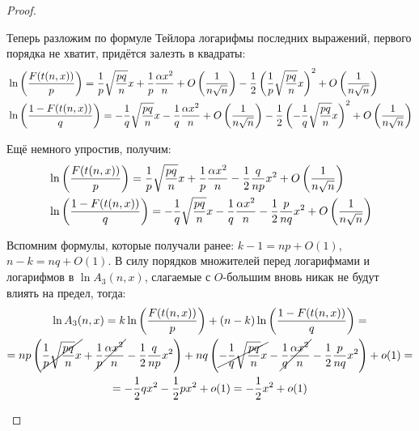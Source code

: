 \begin{proof}
\begin{itemize}
        Теперь разложим по формуле Тейлора логарифмы последних выражений, первого порядка не хватит, придётся залезть в квадраты:
        \begin{align*}
            & \ln \left(\frac{F(t(n, x))}{p}\right) = \frac{1}{p} \sqrt{\frac{pq}{n}} x + \frac{1}{p} \frac{\alpha x^2}{n} + O\left(\frac{1}{n \sqrt{n}}\right) - \frac{1}{2} \left(\frac{1}{p} \sqrt{\frac{pq}{n}} x\right)^2 + O\left(\frac{1}{n \sqrt{n}}\right)
            \\
            & \ln\left(\frac{1-F(t(n, x))}{q}\right) = -\frac{1}{q} \sqrt{\frac{pq}{n}} x - \frac{1}{q} \frac{\alpha x^2}{n} + O\left(\frac{1}{n \sqrt{n}}\right) - \frac{1}{2} \left(-\frac{1}{q} \sqrt{\frac{pq}{n}} x\right)^2 + O\left(\frac{1}{n \sqrt{n}}\right)
        \end{align*}

        Ещё немного упростив, получим:
        \begin{align*}
            & \ln \left(\frac{F(t(n, x))}{p}\right) = \frac{1}{p} \sqrt{\frac{pq}{n}} x + \frac{1}{p} \frac{\alpha x^2}{n} - \frac{1}{2} \frac{q}{np} x^2 + O\left(\frac{1}{n \sqrt{n}}\right)
            \\
            & \ln\left(\frac{1-F(t(n, x))}{q}\right) = -\frac{1}{q} \sqrt{\frac{pq}{n}} x - \frac{1}{q} \frac{\alpha x^2}{n} - \frac{1}{2} \frac{p}{nq} x^2 + O\left(\frac{1}{n \sqrt{n}}\right)
        \end{align*}

        Вспомним формулы, которые получали ранее: $k-1 = np + O(1)$, $n-k = nq + O(1)$. В силу порядков множителей перед логарифмами и логарифмов в $\ln A_3(n, x)$, слагаемые с $O$-большим вновь никак не будут влиять на предел, тогда:
        \begin{multline*}
            \ln A_3(n, x) = k \ln \left(\frac{F(t(n, x))}{p}\right) + (n-k) \ln \left(\frac{1-F(t(n, x))}{q}\right) =
            \\
            = np \left(\cancel{\frac{1}{p} \sqrt{\frac{pq}{n}} x} + \cancel{\frac{1}{p} \frac{\alpha x^2}{n}} - \frac{1}{2} \frac{q}{np} x^2\right) + nq \left(\cancel{-\frac{1}{q} \sqrt{\frac{pq}{n}} x} - \cancel{\frac{1}{q} \frac{\alpha x^2}{n}} - \frac{1}{2} \frac{p}{nq} x^2\right) + o(1) =
            \\
            = -\frac{1}{2} qx^2 -\frac{1}{2} px^2 + o(1) = -\frac{1}{2} x^2 + o(1)
        \end{multline*}


\end{itemize}
\end{proof}
